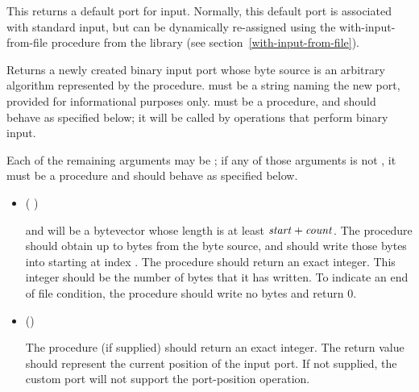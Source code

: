 \begin{entry}{%
}
 
This returns a default port for input.  Normally, this default port
is associated with standard input, but can be dynamically re-assigned
using the {\cf with-input-from-file} procedure from the
 library (see section~\ref{with-input-from-file}).
\end{entry}

\begin{entry}{%
}

Returns a newly created binary input port whose byte source is
an arbitrary algorithm represented by the  procedure.
 must be a string naming the new port,
provided for informational purposes only.
 must be a procedure, and should behave as specified
below; it will be called by operations that perform binary input.

Each of the remaining arguments may be \schfalse{}; if any of
those arguments is not \schfalse{}, it must be a procedure and
should behave as specified below.
   
\begin{itemize}
\item {\cf (   )}
       
  and  will be a bytevector whose length is at least
  $\textnormal{\textit{start}} + \textnormal{\textit{count}}$.
  The  procedure should obtain up to  bytes
  from the byte source, and should write those bytes
  into  starting at index .
  The  procedure should return an exact integer.  This
  integer should be the number of bytes that it has written.
  To indicate an end of file condition, the 
  procedure should write no bytes and return 0.

\item {\cf ()}
       
  The  procedure (if supplied) should return an exact
  integer.  The return value should represent the current position of
  the input port.  If not supplied, the custom port will not support
  the {\cf port-position} operation.
  

\end{itemize}
\end{entry}
